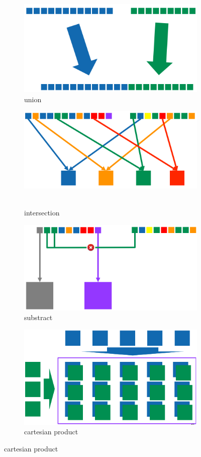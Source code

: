\documentclass[11pt,oneside,a4paper]{article}
\begin{document}
\begin{figure}[hb!]
	\centering
	\begin{subfigure}[t]{.21\textwidth}
		\centering
		\includegraphics[width=0.7\linewidth]{figures/spark_union}
		\caption{union}
	\end{subfigure}%
	\begin{subfigure}[t]{.21\textwidth}
		\centering
		\includegraphics[width=0.7\linewidth]{figures/spark_intersection}\
		\caption{intersection}
	\end{subfigure}
	\begin{subfigure}[t]{.21\textwidth}
		\centering
		\includegraphics[width=0.7\linewidth]{figures/spark_substract}
		\caption{substract}
	\end{subfigure}
	\begin{subfigure}[t]{.21\textwidth}
	\centering
	\includegraphics[width=0.7\linewidth]{figures/spark_cart_product}
	\caption{cartesian product}
	\end{subfigure}
\end{figure}
\end{document}
